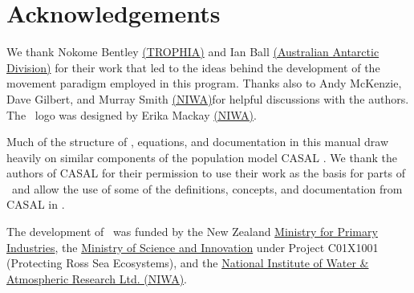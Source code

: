 \section{Acknowledgements\label{sec:acknowledgements}}

We thank Nokome Bentley \href{http://www.trophia.co.nz}{(TROPHIA)} and Ian Ball \href{http://www.aad.gov.au}{(Australian Antarctic Division)} for their work that led to the ideas behind the development of the movement paradigm employed in this program. Thanks also to Andy McKenzie, Dave Gilbert, and Murray Smith \href{http://www.niwa.co.nz}{(NIWA)}for  helpful discussions with the authors. The \SPM\ logo was designed by Erika Mackay \href{http://www.niwa.co.nz}{(NIWA)}. 

Much of the structure of \SPM, equations, and documentation in this manual draw heavily on similar components of the population model CASAL \citep{1388}. We thank the authors of CASAL for their permission to use their work as the basis for parts of \SPM\ and allow the use of some of the definitions, concepts, and documentation from CASAL in \SPM. 

The development of \SPM\ was funded by the New Zealand \href{http://www.mpi.govt.nz}{Ministry for Primary Industries}, the \href{http://www.msi.govt.nz}{Ministry of Science and Innovation} under Project C01X1001 (Protecting Ross Sea Ecosystems), and the \href{http://www.niwa.co.nz}{National Institute of Water \& Atmospheric Research Ltd. (NIWA)}. 
